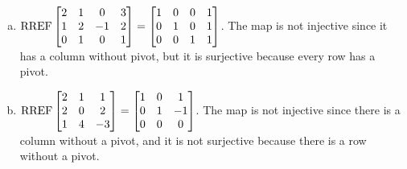 \begin{solution}
\begin{enumerate}[(a)]
\item
  \(\operatorname{RREF}\begin{bmatrix}
    2 & 1 & 0 & 3 \\
    1 & 2 & -1 & 2\\
    0 & 1 & 0 & 1
  \end{bmatrix}=\begin{bmatrix}
    1 & 0 & 0 & 1\\
    0 & 1 & 0 & 1\\
    0 & 0 & 1 & 1
  \end{bmatrix}\).
  The map is not injective since it has a column without pivot,
  but it is surjective because every row has a pivot.
\item
  \(\operatorname{RREF}\begin{bmatrix}
    2 & 1 & 1 \\
    2 & 0 & 2 \\
    1 & 4 & -3
  \end{bmatrix}=\begin{bmatrix}
    1 & 0 & 1 \\
    0 & 1 & -1 \\
    0 & 0 & 0
  \end{bmatrix}\).
  The map is not injective since there is a column without a pivot,
  and it is not surjective because there is a row without a pivot.
\end{enumerate}
\end{solution}
